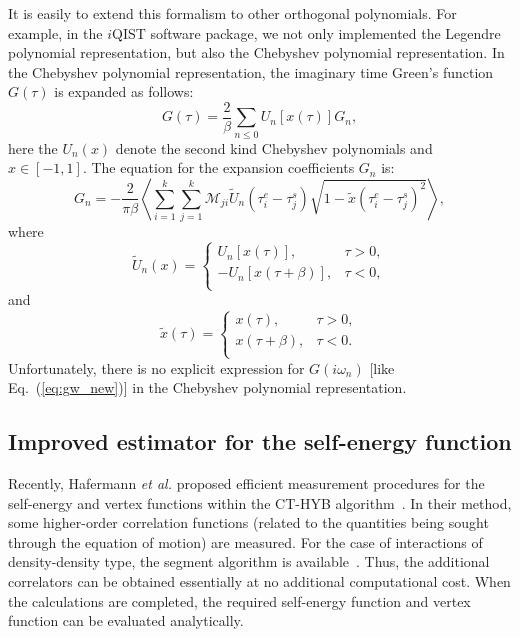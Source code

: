 It is easily to extend this formalism to other orthogonal polynomials. For example, in the $i$QIST software package, we not only implemented the Legendre polynomial representation, but also the Chebyshev polynomial representation. In the Chebyshev polynomial representation, the imaginary time Green's function $G(\tau)$ is expanded as follows:
\begin{equation}
G(\tau) = \frac{2}{\beta} \sum_{n \leq 0} U_n [x({\tau})]G_{n},
\end{equation}
here the $U_n(x)$ denote the second kind Chebyshev polynomials and $x \in [-1,1]$. The equation for the expansion coefficients $G_n$ is:
\begin{equation}
G_n = -\frac{2}{\pi\beta} \left\langle  \sum^{k}_{i=1} \sum^{k}_{j=1} 
\mathcal{M}_{ji} 
\tilde{U}_{n}(\tau^e_i - \tau^s_j)
\sqrt{1 - \tilde{x}(\tau^e_i - \tau^s_j)^2}
\right\rangle,
\end{equation}
where
\begin{equation}
\tilde{U}_n (x) = 
\begin{cases}
U_n[x(\tau)], & \tau > 0, \\
-U_n[x(\tau+\beta)], & \tau < 0, \\
\end{cases}
\end{equation}
and
\begin{equation}
\tilde{x}(\tau) = 
\begin{cases}
x(\tau), & \tau > 0, \\
x(\tau + \beta), & \tau < 0. \\
\end{cases}
\end{equation}
Unfortunately, there is no explicit expression for $G(i\omega_n)$ [like Eq.~(\ref{eq:gw_new})] in the Chebyshev polynomial representation.

\subsection{Improved estimator for the self-energy function}
Recently, Hafermann \emph{et al.} proposed efficient measurement procedures for the self-energy and vertex functions within the CT-HYB algorithm~\cite{PhysRevB.85.205106,PhysRevB.89.235128}. In their method, some higher-order correlation functions (related to the quantities being sought through the equation of motion) are measured. For the case of interactions of density-density type, the segment algorithm is available~\cite{PhysRevLett.97.076405}. Thus, the additional correlators can be obtained essentially at no additional computational cost. When the calculations are completed, the required self-energy function and vertex function can be evaluated analytically.

